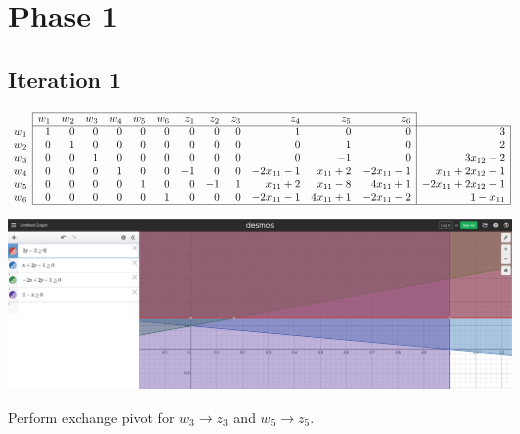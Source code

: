 \documentclass[12pt]{article}
\begin{document}
\section*{Phase 1}
\subsection*{Iteration 1}

\renewcommand{\arraystretch}{1.5}
$\begin{array}{c|rrrrrrrrrrrr|r|}
\cline{2-13}
& w_1 & w_2 & w_3 & w_4 & w_5 & w_6 & z_1 & z_2 & z_3 & z_4 & z_5 & z_6 \\
\cline{2-14}
w_1 & 1 & 0 & 0 & 0 & 0 & 0 & 0 & 0 & 0 & 1 & 0 & 0 & 3 \\
w_2 & 0 & 1 & 0 & 0 & 0 & 0 & 0 & 0 & 0 & 0 & 1 & 0 & 2 \\
w_3 & 0 & 0 & 1 & 0 & 0 & 0 & 0 & 0 & 0 & 0 & -1 & 0 & 3 x_{12} - 2 \\
w_4 & 0 & 0 & 0 & 1 & 0 & 0 & -1 & 0 & 0 & - 2 x_{11} - 1 & x_{11} + 2 & - 2 x_{11} - 1 & x_{11} + 2 x_{12} - 1 \\
w_5 & 0 & 0 & 0 & 0 & 1 & 0 & 0 & -1 & 1 & x_{11} + 2 & x_{11} - 8 & 4 x_{11} + 1 & - 2 x_{11} + 2 x_{12} - 1 \\
w_6 & 0 & 0 & 0 & 0 & 0 & 1 & 0 & 0 & 0 & - 2 x_{11} - 1 & 4 x_{11} + 1 & - 2 x_{11} - 2 & 1 - x_{11} \\
\cline{2-14}
\end{array}$

\begin{center}
\includegraphics[scale=.3]{Phase1_iteration1_visual}
\end{center}

Perform exchange pivot for $w_3 \rightarrow z_3$ and $w_5 \rightarrow z_5$.
\end{document}
